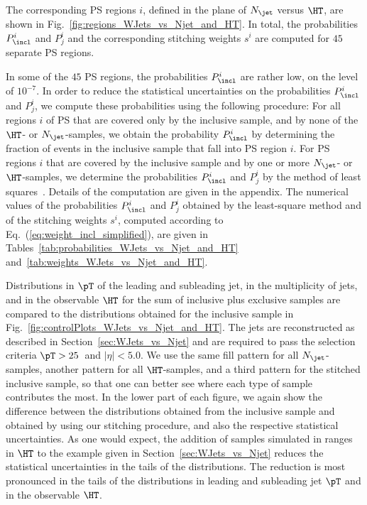 The corresponding PS regions $i$, defined in the plane of $N_{\jet}$ versus $\HT$, are shown in Fig.~\ref{fig:regions_WJets_vs_Njet_and_HT}.
In total, the probabilities $P_{\incl}^{i}$ and $P_{j}^{i}$ and the corresponding stitching weights $s^{i}$ are computed for $45$ separate PS regions.

In some of the $45$ PS regions, the probabilities $P_{\incl}^{i}$ are rather low, on the level of $10^{-7}$.
In order to reduce the statistical uncertainties on the probabilities $P_{\incl}^{i}$ and $P_{j}^{i}$,
we compute these probabilities using the following procedure:
For all regions $i$ of PS that are covered only by the inclusive sample, and by none of the $\HT$- or $N_{\jet}$-samples,
we obtain the probability $P_{\incl}^{i}$ by determining the fraction of events in the inclusive sample that fall into PS region $i$.
For PS regions $i$ that are covered by the inclusive sample and by one or more $N_{\jet}$- or $\HT$-samples,
we determine the probabilities $P_{\incl}^{i}$ and $P_{j}^{i}$ by the method of least squares~\cite{Cowan:1998ji}.
Details of the computation are given in the appendix.
The numerical values of the probabilities $P_{\incl}^{i}$ and $P_{j}^{i}$ obtained by the least-square method
and of the stitching weights $s^{i}$, computed according to Eq.~(\ref{eq:weight_incl_simplified}), are given in Tables~\ref{tab:probabilities_WJets_vs_Njet_and_HT}
and~\ref{tab:weights_WJets_vs_Njet_and_HT}.

Distributions in $\pT$ of the leading and subleading jet,
in the multiplicity of jets, and in the observable $\HT$ 
for the sum of inclusive plus exclusive samples are compared to the distributions obtained for the inclusive sample in Fig.~\ref{fig:controlPlots_WJets_vs_Njet_and_HT}.
The jets are reconstructed as described in Section~\ref{sec:WJets_vs_Njet} and are required to pass the selection criteria $\pT > 25$~\GeV and $\vert\eta\vert < 5.0$.
We use the same fill pattern for all $N_{\jet}$-samples, another pattern for all $\HT$-samples, and a third pattern for the stitched inclusive sample,
so that one can better see where each type of sample contributes the most.
In the lower part of each figure, we again show the difference between the distributions obtained from the inclusive sample and obtained by using our stitching procedure,
and also the respective statistical uncertainties.
As one would expect, the addition of samples simulated in ranges in $\HT$ to the example given in Section~\ref{sec:WJets_vs_Njet}
reduces the statistical uncertainties in the tails of the distributions.
The reduction is most pronounced in the tails of the distributions in leading and subleading jet $\pT$ and in the observable $\HT$.

